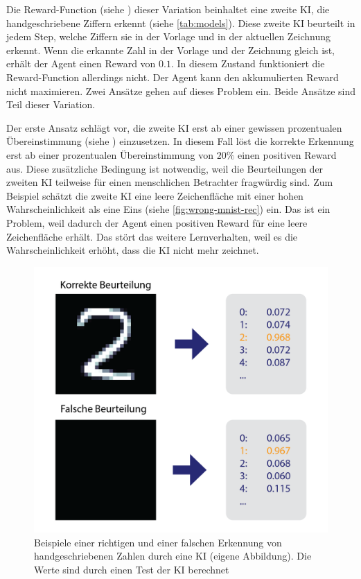 Die Reward-Function (siehe ) dieser Variation beinhaltet
eine zweite KI, die handgeschriebene Ziffern erkennt (siehe
\autoref{tab:models}). Diese zweite KI beurteilt in jedem Step, welche
Ziffern sie in der Vorlage und in der aktuellen  %
Zeichnung erkennt. Wenn die erkannte Zahl in der Vorlage und der Zeichnung
gleich ist, erhält der Agent einen Reward von $0.1$. In diesem Zustand
funktioniert die Reward-Function allerdings nicht. Der Agent kann den
akkumulierten Reward nicht maximieren. Zwei Ansätze gehen auf dieses Problem
ein. Beide Ansätze sind Teil dieser Variation.

Der erste Ansatz schlägt vor, die zweite KI erst ab einer gewissen prozentualen
Übereinstimmung (siehe ) einzusetzen. In diesem Fall
löst die korrekte Erkennung erst ab einer prozentualen Übereinstimmung von
$20\%$ einen positiven Reward aus. Diese zusätzliche Bedingung ist notwendig,
weil die Beurteilungen der zweiten KI teilweise für einen menschlichen
Betrachter fragwürdig sind. Zum Beispiel schätzt die zweite KI eine leere
Zeichenfläche mit einer hohen Wahrscheinlichkeit als eine Eins (siehe
\autoref{fig:wrong-mnist-rec}) ein. Das ist ein Problem, weil dadurch der Agent einen
positiven Reward für eine leere Zeichenfläche erhält. Das stört das weitere
Lernverhalten, weil es die Wahrscheinlichkeit erhöht, dass die KI nicht mehr
zeichnet.

\begin{figure}[!ht]
  \centering
  \includegraphics[width=\textwidth]{images/methode/wrong-mnist-rec.png}
  \caption{Beispiele einer richtigen und einer falschen Erkennung von handgeschriebenen Zahlen durch eine KI (eigene Abbildung). Die Werte sind durch einen Test der KI berechnet }
  \label{fig:wrong-minst-rec}
\end{figure}


